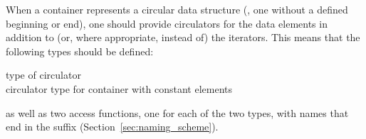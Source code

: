 When a container represents a circular data structure (\ie, one without a
defined beginning or end), one should provide circulators for the data
elements in addition to (or, where appropriate, instead of) the iterators.
This means that the following types should be defined:
\begin{tabbing}
 \> type of circulator \\
 \> circulator type for container with constant elements
\end{tabbing}
as well as two access functions, one for each of the two types, with names
that end in the suffix  (Section~\ref{sec:naming_scheme}).

